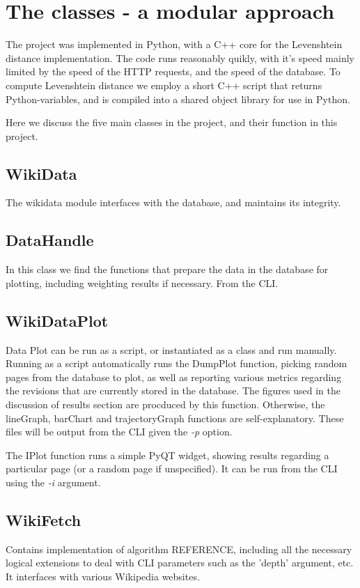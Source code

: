 \section{The classes - a modular approach}
The project was implemented in Python, with a C++ core for the
Levenshtein distance implementation. The code runs reasonably quikly,
with it's speed mainly limited by the speed of the HTTP requests, and
the speed of the database. To compute Levenshtein distance we employ a
short C++ script that returns Python-variables, and is compiled into a
shared object library for use in Python. 

Here we discuss the five main classes in the project, and their
function in this project.

\subsection*{WikiData}
The wikidata module interfaces with the database, and maintains its
integrity. 

\subsection*{DataHandle}
In this class we find the functions that prepare the data in the
database for plotting, including weighting results if necessary. From
the CLI. 

\subsection*{WikiDataPlot}
Data Plot can be run as a script, or instantiated as a class and run
manually. Running as a script automatically runs the DumpPlot
function, picking random pages from the database to plot, as well as
reporting various metrics regarding the revisions that are currently
stored in the database. The figures used in the discussion of results
section are procduced by this function. Otherwise, the lineGraph,
barChart and trajectoryGraph functions are self-explanatory. These
files will be output from the CLI given the \textit{-p} option.

The IPlot function runs a simple PyQT widget, showing results regarding a
particular page (or a random page if unspecified). It can be run from
the CLI using the \textit{-i} argument.

\subsection*{WikiFetch}
Contains implementation of algorithm REFERENCE, including all the
necessary logical extensions to deal with CLI parameters such as the
'depth' argument, etc. It interfaces with various Wikipedia websites. 

